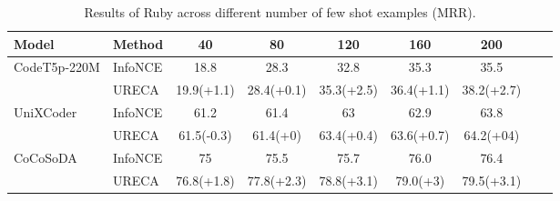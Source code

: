 \begin{table}[h]
\def\arraystretch{1.0}
\setlength\tabcolsep{8pt} %
\begin{tabular}{@{}lllcccccc@{}}

\toprule
Model                            & \multicolumn{1}{l}{Method}             & \multicolumn{1}{c}{40}           
& \multicolumn{1}{c}{80}         & \multicolumn{1}{c}{120}               & \multicolumn{1}{c}{160}     
& \multicolumn{1}{c}{200}        \\ \midrule

\multirow{2}{*}{CodeT5p-220M}      
& InfoNCE                   & \multicolumn{1}{c}{18.8}                & \multicolumn{1}{c}{28.3}          
                            & \multicolumn{1}{c}{32.8}                & \multicolumn{1}{c}{35.3}          
                            & \multicolumn{1}{c}{35.5}                   
                            \\ \cmidrule(l){2-7} 
& URECA                     & \multicolumn{1}{c}{19.9(+1.1)}          & \multicolumn{1}{c}{28.4(+0.1)}          
                            & \multicolumn{1}{c}{35.3(+2.5)}          & \multicolumn{1}{c}{36.4(+1.1)}          
                            & \multicolumn{1}{c}{38.2(+2.7)}                  
                            \\ \midrule

\multirow{2}{*}{UniXCoder} 
& InfoNCE                   & \multicolumn{1}{c}{61.2}                & \multicolumn{1}{c}{61.4}          
                            & \multicolumn{1}{c}{63}                  & \multicolumn{1}{c}{62.9}                
                            & \multicolumn{1}{c}{63.8}                  
                            \\ \cmidrule(l){2-7} 
& URECA                     & \multicolumn{1}{c}{61.5(-0.3)}          & \multicolumn{1}{c}{61.4(+0)}          
                            & \multicolumn{1}{c}{63.4(+0.4)}          & \multicolumn{1}{c}{63.6(+0.7)}          
                            & \multicolumn{1}{c}{64.2(+04)}                   
                            \\ \midrule

\multirow{2}{*}{CoCoSoDA} 
& InfoNCE                   & \multicolumn{1}{c}{75}                  & \multicolumn{1}{c}{75.5}          
                            & \multicolumn{1}{c}{75.7}                & \multicolumn{1}{c}{76.0}          
                            & \multicolumn{1}{c}{76.4}                    
                            \\ \cmidrule(l){2-7} 
& URECA                     & \multicolumn{1}{c}{76.8(+1.8)}          & \multicolumn{1}{c}{77.8(+2.3)}          
                            & \multicolumn{1}{c}{78.8(+3.1)}          & \multicolumn{1}{c}{79.0(+3)}          
                            & \multicolumn{1}{c}{79.5(+3.1)}                   
                            \\ \bottomrule 
\end{tabular}
\caption{Results of Ruby across different number of few shot examples (MRR).}
\label{CSN_Ruby}
\end{table}

